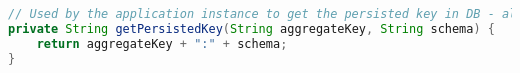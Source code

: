 \begin{lstlisting}[language=Java, caption={Funksjon som oppfyller rollen tl objektet ''AppVersionResolver'' fra figur \ref{fig5}.}]
// Used by the application instance to get the persisted key in DB - always run before a query
private String getPersistedKey(String aggregateKey, String schema) {
    return aggregateKey + ":" + schema;
}
\end{lstlisting}

